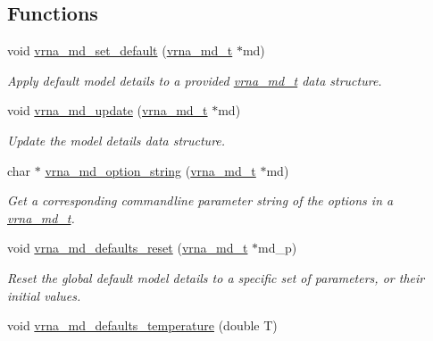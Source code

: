 \subsection*{Functions}
\begin{DoxyCompactItemize}
\item 
void \hyperlink{group__model__details_ga8ac6ff84936282436f822644bf841f66}{vrna\+\_\+md\+\_\+set\+\_\+default} (\hyperlink{group__model__details_ga1f8a10e12a0a1915f2a4eff0b28ea17c}{vrna\+\_\+md\+\_\+t} $\ast$md)
\begin{DoxyCompactList}\small\item\em Apply default model details to a provided \hyperlink{group__model__details_ga1f8a10e12a0a1915f2a4eff0b28ea17c}{vrna\+\_\+md\+\_\+t} data structure. \end{DoxyCompactList}\item 
void \hyperlink{group__model__details_ga36ae40b8c3b82362f5798ad5b047b814}{vrna\+\_\+md\+\_\+update} (\hyperlink{group__model__details_ga1f8a10e12a0a1915f2a4eff0b28ea17c}{vrna\+\_\+md\+\_\+t} $\ast$md)
\begin{DoxyCompactList}\small\item\em Update the model details data structure. \end{DoxyCompactList}\item 
char $\ast$ \hyperlink{group__model__details_ga3a7469f0725a849af6ba61a57dfd60ce}{vrna\+\_\+md\+\_\+option\+\_\+string} (\hyperlink{group__model__details_ga1f8a10e12a0a1915f2a4eff0b28ea17c}{vrna\+\_\+md\+\_\+t} $\ast$md)
\begin{DoxyCompactList}\small\item\em Get a corresponding commandline parameter string of the options in a \hyperlink{group__model__details_ga1f8a10e12a0a1915f2a4eff0b28ea17c}{vrna\+\_\+md\+\_\+t}. \end{DoxyCompactList}\item 
void \hyperlink{group__model__details_ga70834424cf804d149937de89f80ceb45}{vrna\+\_\+md\+\_\+defaults\+\_\+reset} (\hyperlink{group__model__details_ga1f8a10e12a0a1915f2a4eff0b28ea17c}{vrna\+\_\+md\+\_\+t} $\ast$md\+\_\+p)
\begin{DoxyCompactList}\small\item\em Reset the global default model details to a specific set of parameters, or their initial values. \end{DoxyCompactList}\item 
void \hyperlink{group__model__details_gaf9e527e9a2f7e6fd6e42bc6e602f5445}{vrna\+\_\+md\+\_\+defaults\+\_\+temperature} (double T)

\end{DoxyCompactItemize}
